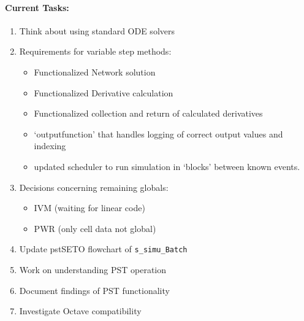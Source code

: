 \documentclass[12pt]{article}
\begin{document}
\begin{multicols}{2}
\vfill\null
\columnbreak

	
\paragraph{Current Tasks:}
	\begin{enumerate}
		\itemsep 0em 
		\item Think about using standard ODE solvers
				\item Requirements for variable step methods:
						\begin{minipage}{\linewidth}
							\begin{itemize}
								\itemsep0em 
								\footnotesize
								\item Functionalized Network solution
								\item Functionalized Derivative calculation
								\item Functionalized collection and return of calculated derivatives
								\item `outputfunction' that handles logging of correct output values and indexing
								\item updated scheduler to run simulation in `blocks' between known events.
							\end{itemize}
						\end{minipage}
		\item Decisions concerning remaining globals:
		\begin{minipage}{\linewidth}
						\begin{itemize}
				\itemsep0em 
						\footnotesize
							\item IVM (waiting for linear code)
							\item PWR (only cell data not global)
						\end{itemize}
				\end{minipage}
	
		\item Update pstSETO flowchart of \verb|s_simu_Batch|
		\item Work on understanding PST operation
		\item Document findings of PST functionality
		\item Investigate Octave compatibility
\end{enumerate}




\end{multicols}
\end{document}
